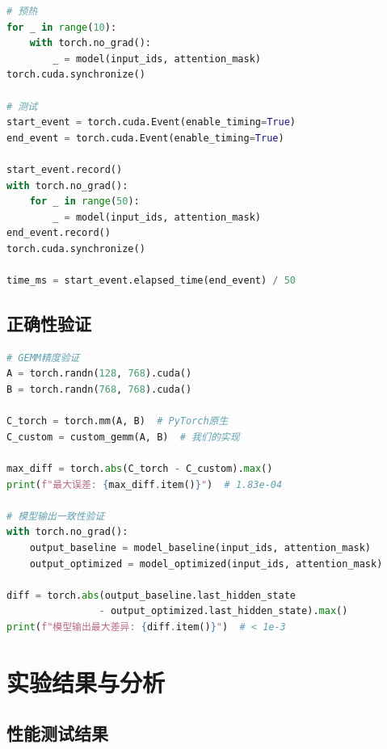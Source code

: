 \documentclass[12pt,a4paper]{article}
\begin{document}
\begin{lstlisting}[language=Python,caption=性能测试代码]
# 预热
for _ in range(10):
    with torch.no_grad():
        _ = model(input_ids, attention_mask)
torch.cuda.synchronize()

# 测试
start_event = torch.cuda.Event(enable_timing=True)
end_event = torch.cuda.Event(enable_timing=True)

start_event.record()
with torch.no_grad():
    for _ in range(50):
        _ = model(input_ids, attention_mask)
end_event.record()
torch.cuda.synchronize()

time_ms = start_event.elapsed_time(end_event) / 50
\end{lstlisting}

\subsection{正确性验证}

\begin{lstlisting}[language=Python,caption=精度验证]
# GEMM精度验证
A = torch.randn(128, 768).cuda()
B = torch.randn(768, 768).cuda()

C_torch = torch.mm(A, B)  # PyTorch原生
C_custom = custom_gemm(A, B)  # 我们的实现

max_diff = torch.abs(C_torch - C_custom).max()
print(f"最大误差: {max_diff.item()}")  # 1.83e-04

# 模型输出一致性验证
with torch.no_grad():
    output_baseline = model_baseline(input_ids, attention_mask)
    output_optimized = model_optimized(input_ids, attention_mask)

diff = torch.abs(output_baseline.last_hidden_state 
                - output_optimized.last_hidden_state).max()
print(f"模型输出最大差异: {diff.item()}")  # < 1e-3
\end{lstlisting}

\section{实验结果与分析}

\subsection{性能测试结果}
\end{document}
